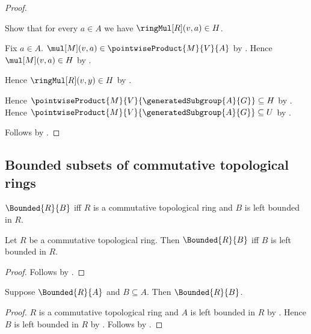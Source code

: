 \begin{proof}
\begin{subproof}
\begin{subproof}
            Show that for every $a\in A$ we have
                $\ringMul[R](v,a)\in H$.
            \begin{subproof}
                Fix $a\in A$.
                $\mul[M](v,a)\in\pointwiseProduct{M}{V}{A}$ by
                    .
                Hence $\mul[M](v,a)\in H$ by .
            \end{subproof}
            Hence $\ringMul[R](v,y)\in H$ by
                .
        \end{subproof}
        Hence $\pointwiseProduct{M}{V}{\generatedSubgroup{A}{G}}\subseteq H$
            by .
        Hence $\pointwiseProduct{M}{V}{\generatedSubgroup{A}{G}}\subseteq U$
            by .
    \end{subproof}
    Follows by .
\end{proof}

\subsection{Bounded subsets of commutative topological rings}

\begin{definition}\label{bounded_in_commutative_topological_ring}
    $\Bounded{R}{B}$ iff
        $R$ is a commutative topological ring and $B$ is left bounded in $R$.
\end{definition}

\begin{proposition}\label{bounded_iff_left_bounded}
    Let $R$ be a commutative topological ring.
    Then $\Bounded{R}{B}$ iff $B$ is left bounded in $R$.
\end{proposition}
\begin{proof}
    Follows by .
\end{proof}

\begin{corollary}\label{bounded_downward}
    Suppose $\Bounded{R}{A}$ and $B\subseteq A$.
    Then $\Bounded{R}{B}$.
\end{corollary}
\begin{proof}
    $R$ is a commutative topological ring and $A$ is left bounded in $R$ by
        .
    Hence $B$ is left bounded in $R$ by .
    Follows by .
\end{proof}

